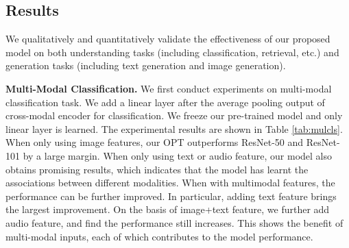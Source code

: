\documentclass[10pt,twocolumn,letterpaper]{article}
\begin{document}
\begin{table}[!t]
\begin{center}
\caption{Linear probe results on multi-label classification task. The performance is evaluated on Open Images val set.}
\label{tab:mulcls}
\end{center}
\end{table}

\subsection{Results}
We qualitatively and quantitatively validate the effectiveness of our proposed model on both understanding tasks (including classification, retrieval, etc.) and generation tasks (including text generation and image generation).

\textbf{Multi-Modal Classification.} We first conduct experiments on multi-modal classification task. We add a linear layer after the average pooling output of cross-modal encoder for classification. We freeze our pre-trained model and only linear layer is learned. The experimental results are shown in Table \ref{tab:mulcls}. When only using image features, our OPT outperforms ResNet-50 and ResNet-101 by a large margin. When only using text or audio feature, our model also obtains promising results, which indicates that the model has learnt the associations between different modalities. When with multimodal features, the performance can be further improved. In particular, adding text feature brings the largest improvement. On the basis of image+text feature, we further add audio feature, and find the performance still increases. This shows the benefit of multi-modal inputs, each of which contributes to the model performance.  
\end{document}
